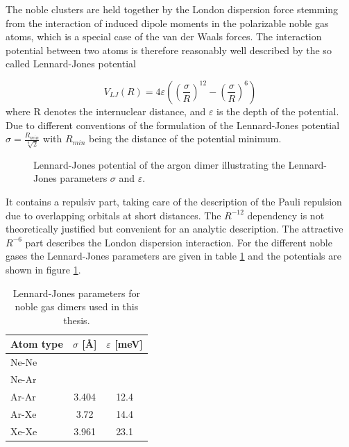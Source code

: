 The noble clusters are held together by the London dispersion force
stemming from the interaction of induced dipole moments in the polarizable
noble gas atoms, which is a special case of the van der Waals forces.
The interaction potential between two atoms is therefore reasonably
well described by the so called
Lennard-Jones potential

\begin{equation}
  V_{LJ}(R) = 4 \varepsilon \left( \left(\frac{\sigma}{R}\right) ^{12}
              - \left(\frac{\sigma}{R}\right) ^{6} \right)
\end{equation}
where R denotes the internuclear distance, 
and $\varepsilon$ is the depth of the
potential. Due to different conventions of the formulation
of the Lennard-Jones potential $\sigma=\frac{R_{min}}{\sqrt[6]{2}}$
with $R_{min}$ being the distance of the potential minimum.

\begin{figure}[h]
 \centering
 
 \caption{Lennard-Jones potential of the argon dimer illustrating the
          Lennard-Jones parameters $\sigma$ and $\varepsilon$.}
 \label{figure:LJ_Ar2}
\end{figure}

It contains a repulsiv part, taking care of the description of the
Pauli repulsion due to overlapping orbitals at short distances. The
$R^{-12}$ dependency is not theoretically justified but convenient
for an analytic description. The attractive $R^{-6}$ part describes
the London dispersion interaction.
For the different noble gases the Lennard-Jones parameters are given in
table \ref{table:LJ_parameter} and the potentials are shown in
figure \ref{figure:LJ_Ar2}.

\begin{table}[htb]
 \caption{Lennard-Jones parameters for noble gas dimers used in this
          thesis.}
 \centering
 \begin{tabular}{lcc}
   \toprule
   Atom type & $\sigma$ [\unit{\AA}] & $\varepsilon$ [\unit{meV}]\\
   \midrule
   Ne-Ne     & &\\
   Ne-Ar     &&\\
   Ar-Ar     &                 3.404 & 12.4\\
   Ar-Xe     &                 3.72  & 14.4\\
   Xe-Xe     &                 3.961 & 23.1\\
   \bottomrule
 \end{tabular}
 \label{table:LJ_parameter}
\end{table}


